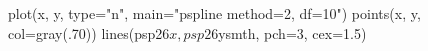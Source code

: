 \begin{Schunk}
\begin{Sinput}
 plot(x, y, type="n", main="pspline method=2, df=10")
 points(x, y, col=gray(.70))
 lines(psp26$x, psp26$ysmth, pch=3, cex=1.5)
\end{Sinput}
\end{Schunk}
